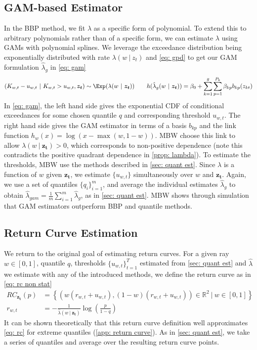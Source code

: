 \documentclass[12pt]{article}
\begin{document}
  \subsection{GAM-based Estimator}
    In the BBP method, we fit $\lambda$ as a specific form of polynomial. 
    To extend this to arbitrary polynomials rather than of a specific form, we can estimate $\lambda$ using GAMs with polynomial splines. 
    We leverage the exceedance distribution being exponentially distributed with rate $\lambda(w \ |\ z_t)$ and \cref{eq: gpd} to get our GAM formulation $\hat{\lambda}_{g}$ in \cref{eq: gam}
    \begin{equation} \label{eq: gam}
      (K_{w, t} - u_{w, t} \ |\ K_{w, t} > u_{w, t}, \boldsymbol{z_t}) \sim \Exp(\lambda(w \ |\ \boldsymbol{z_t})) \qquad h(\hat{\lambda}_{g}(w \ |\ \boldsymbol{z_t})) = \beta_0 + \sum_{k = 1}^g \sum_{p = 1}^{P_k} \beta_{kp}b_{kp}(z_{kt})
    \end{equation}
    In \cref{eq: gam}, the left hand side gives the exponential CDF of conditional exceedances for some chosen quantile $q$ and corresponding threshold $u_{w, t}$.
    The right hand side gives the GAM estimator in terms of a basis $b_{kp}$ and the link function $h_w(x) = \log(x - \max(w, 1 - w))$.
    MBW choose this link to allow $\lambda(w \ |\ \boldsymbol{z_t}) > 0$, which corresponds to non-positive dependence (note this contradicts the positive quadrant dependence in \cref{prop: lambda}).
    To estimate the thresholds, MBW use the methods described in \cref{sec: quant est}. 
    Since $\lambda$ is a function of $w$ given $\boldsymbol{z_t}$, we estimate $\{ u_{w, t} \}$ simultaneously over $w$ and $\boldsymbol{z_t}$.
    Again, we use a set of quantiles $\{q_i\}_{i = 1}^m$, and average the individual estimates $\hat{\lambda}_{g}$ to obtain $\hat{\lambda}_{gam} = \frac{1}{m}\sum_{i = 1}^m \hat{\lambda}_{g}$, as in \cref{sec: quant est}.
    MBW shows through simulation that GAM estimators outperform BBP and quantile methods.

  \subsection{Return Curve Estimation}
    We return to the original goal of estimating return curves. 
    For a given ray $w \in [0, 1]$, quantile $q$, thresholds $\{u_{w, t}\}_{t = 1}^T$ estimated from \cref{sec: quant est} and $\hat{\lambda}$ we estimate with any of the introduced methods, we define the return curve as in \cref{eq: rc non stat}
    \begin{align} \label{eq: rc non stat}
      RC_{\boldsymbol{z_t}}(p) &= \left\{(w(r_{w, t} + u_{w, t}), (1 - w)(r_{w, t} + u_{w, t})) \in \mathbb{R}^2 \ |\  w \in [0, 1] \right\} \\
      r_{w, t} &= -\frac{1}{\hat{\lambda}(w \ |\ \boldsymbol{z_t})}\log \left( \frac{p}{1 - q} \right)
    \end{align}
    It can be shown theoretically that this return curve definition well approximates \cref{eq: rc} for extreme quantiles (\cref{app: return curve}). 
    As in \cref{sec: quant est}, we take a series of quantiles and average over the resulting return curve points.
\end{document}
